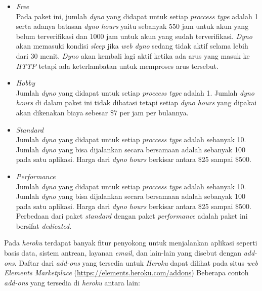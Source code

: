 \begin{itemize}
    \item \textit{Free} \\ 
    Pada paket ini, jumlah \textit{dyno} yang didapat untuk setiap \textit{proccess type} adalah 1 serta adanya batasan \textit{dyno hours} yaitu sebanyak 550 jam untuk akun yang belum terverifikasi dan 1000 jam untuk akun yang sudah terverifikasi. \textit{Dyno} akan memasuki kondisi \textit{sleep} jika \textit{web dyno} sedang tidak aktif selama lebih dari 30 menit. \textit{Dyno} akan kembali lagi aktif ketika ada arus yang masuk ke \textit{HTTP} tetapi ada keterlambatan untuk memproses arus tersebut.  
    \item \textit{Hobby} \\ 
    Jumlah \textit{dyno} yang didapat untuk setiap \textit{proccess type} adalah 1. Jumlah \textit{dyno hours} di dalam paket ini tidak dibatasi tetapi setiap \textit{dyno hours} yang dipakai akan dikenakan biaya sebesar \$7 per jam per bulannya.  
    \item \textit{Standard} \\
    Jumlah \textit{dyno} yang didapat untuk setiap \textit{proccess type} adalah sebanyak 10. Jumlah \textit{dyno} yang bisa dijalankan secara bersamaan adalah sebanyak 100 pada satu aplikasi. Harga dari \textit{dyno hours} berkisar antara \$25 sampai \$500. 
    \item \textit{Performance} \\
    Jumlah \textit{dyno} yang didapat untuk setiap \textit{proccess type} adalah sebanyak 10. Jumlah \textit{dyno} yang bisa dijalankan secara bersamaan adalah sebanyak 100 pada satu aplikasi. Harga dari \textit{dyno hours} berkisar antara \$25 sampai \$500. Perbedaan dari paket \textit{standard} dengan paket \textit{performance} adalah paket ini bersifat \textit{dedicated}. 
\end{itemize}

Pada \textit{heroku} terdapat banyak fitur penyokong untuk menjalankan aplikasi seperti basis data, sistem antrean, layanan \textit{email}, dan lain-lain yang disebut dengan \textit{add-ons}. Daftar dari \textit{add-ons} yang tersedia untuk \textit{Heroku} dapat dilihat pada situs \textit{web} \textit{Elements Marketplace} (\url{https://elements.heroku.com/addons}) Beberapa contoh \textit{add-ons} yang tersedia di \textit{heroku} antara lain:

